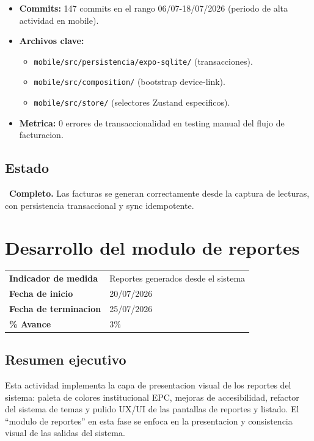 \documentclass[11pt,a4paper,oneside]{report}
\begin{document}
\begin{itemize}[leftmargin=*]
    \item \textbf{Commits:} 147 commits en el rango 06/07-18/07/2026 (periodo de alta actividad en mobile).
    \item \textbf{Archivos clave:}
    \begin{itemize}
        \item \texttt{mobile/src/persistencia/expo-sqlite/} (transacciones).
        \item \texttt{mobile/src/composition/} (bootstrap device-link).
        \item \texttt{mobile/src/store/} (selectores Zustand especificos).
    \end{itemize}
    \item \textbf{Metrica:} 0 errores de transaccionalidad en testing manual del flujo de facturacion.
\end{itemize}

\section{Estado}

\checkmark\ \textbf{Completo.} Las facturas se generan correctamente desde la captura de lecturas, con persistencia transaccional y sync idempotente.


\chapter{Desarrollo del modulo de reportes}

\begin{tabularx}{\textwidth}{L{4cm} X}
\toprule
\textbf{Indicador de medida} & Reportes generados desde el sistema \\
\textbf{Fecha de inicio} & 20/07/2026 \\
\textbf{Fecha de terminacion} & 25/07/2026 \\
\textbf{\% Avance} & 3\% \\
\bottomrule
\end{tabularx}

\section{Resumen ejecutivo}

Esta actividad implementa la capa de presentacion visual de los reportes del sistema: paleta de colores institucional EPC, mejoras de accesibilidad, refactor del sistema de temas y pulido UX/UI de las pantallas de reportes y listado. El ``modulo de reportes'' en esta fase se enfoca en la presentacion y consistencia visual de las salidas del sistema.
\end{document}
